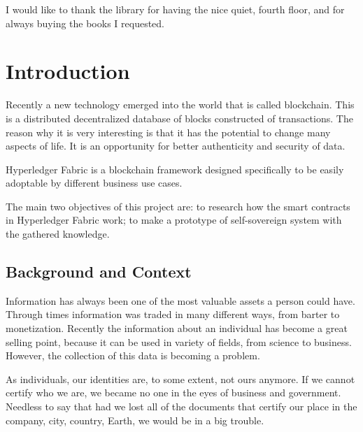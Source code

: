 \documentclass[a4paper,11pt]{report}
\begin{document}
I would like to thank the library for having the nice quiet, fourth floor, and for always buying the books I requested. 


\tableofcontents

\listoffigures                


\clearpage


\setcounter{page}{1}



\chapter{Introduction}

\label{introduction}

Recently a new technology emerged into the world that is called blockchain. This is a distributed decentralized database of blocks constructed of transactions. The reason why it is very interesting is that it has the potential to change many aspects of life. It is an opportunity for better authenticity and security of data. 

Hyperledger Fabric is a blockchain framework designed specifically to be easily adoptable by different business use cases. 

The main two objectives of this project are: to research how the smart contracts in Hyperledger Fabric work; to make a prototype of self-sovereign system with the gathered knowledge. 

\section{Background and Context}

\label{introduction-background}

Information has always been one of the most valuable assets a person could have. Through times information was traded in many different ways, from barter to monetization. Recently the information about an individual has become a great selling point, because it can be used in variety of fields, from science to business. However, the collection of this data is becoming a problem.

	As individuals, our identities are, to some extent, not ours anymore. If we cannot certify who we are, we became no one in the eyes of business and government. Needless to say that had we lost all of the documents that certify our place in the company, city, country, Earth, we would be in a big trouble. \cite{allen2016path}
	
\end{document}
